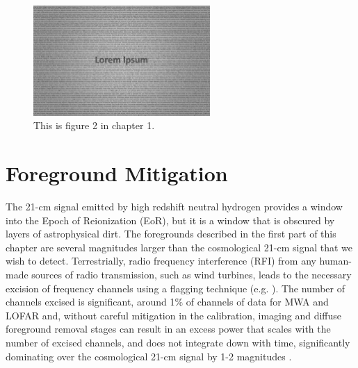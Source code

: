 \begin{figure}[]
\begin{center}
\includegraphics[width=0.6\textwidth]{Chapman_Jelic/01x02}
\end{center}
\caption{This is figure 2 in chapter 1.}
\end{figure}


\section{Foreground Mitigation}
The 21-cm signal emitted by high redshift neutral hydrogen provides a window into the Epoch of Reionization (EoR), but it is a window that is obscured by layers of astrophysical dirt. The foregrounds described in the first part of this chapter are several magnitudes larger than the cosmological 21-cm signal that we wish to detect. 
Terrestrially, radio frequency interference (RFI) from any human-made sources of radio transmission, such as wind turbines, leads to the necessary excision of frequency channels using a flagging technique (e.g. \citet{Prasad2012ExA....33..157P,Offringa2012}). The number of channels excised is significant, around 1$\%$ of channels of data for MWA and LOFAR \citep{Offringa2019MNRAS.484.2866O,Offringa2015PASA...32....8O} and, without careful mitigation in the calibration, imaging and diffuse foreground removal stages can result in an excess power that scales with the number of excised channels, and does not integrate down with time, significantly dominating over the cosmological 21-cm signal by 1-2 magnitudes \citep{Offringa2019MNRAS.484.2866O}. 

